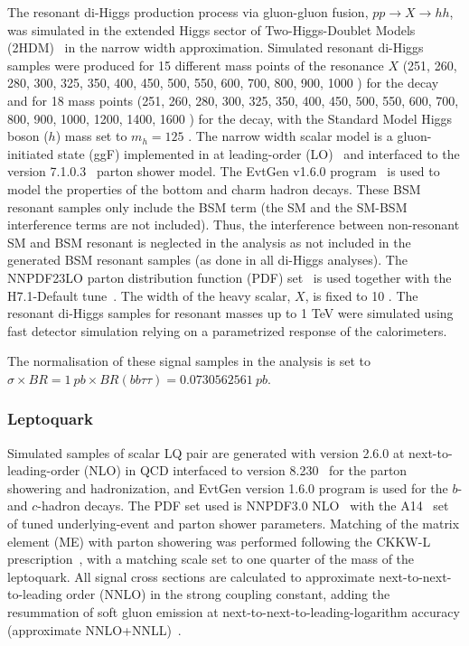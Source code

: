 The resonant di-Higgs production process via gluon-gluon fusion, $pp \rightarrow X \rightarrow hh$, was
simulated in the extended Higgs sector of Two-Higgs-Doublet Models
(2HDM)~\cite{Branco:2011iw} in the narrow width approximation. Simulated
resonant di-Higgs samples were produced for 15 different mass points of the
resonance $X$ (251, 260, 280, 300, 325, 350, 400, 450, 500, 550, 600, 700, 800,
900, 1000 \GeV) for the \lephad decay and for 18 mass points (251, 260, 280, 300, 325, 350, 400, 450, 500, 550, 600, 700, 800,
900, 1000, 1200, 1400, 1600 \GeV) for the \hadhad decay, with the Standard Model Higgs boson ($h$) mass set to $m_h=125$
\GeV. The narrow width scalar model is a gluon-initiated state (ggF) implemented in
\MADGRAPH at leading-order (LO)~\cite{mg5_lo} and interfaced to the  version 7.1.0.3~\cite{Herwigpp}
parton shower model. The EvtGen v1.6.0 program~\cite{EvtGen} is used to model the properties of the bottom and charm hadron decays. 
These BSM resonant samples only include the BSM term (the SM and the SM-BSM interference terms are not included). Thus, the interference between non-resonant SM and BSM resonant is neglected in the analysis as not included in the generated BSM resonant samples (as done in all di-Higgs analyses). The NNPDF23LO parton distribution function (PDF)
set~\cite{NNPDF23PDFSet} is used together with the H7.1-Default
tune~\cite{Gieseke:2012ft}. The width of the heavy scalar, $X$, is fixed to 10
\MeV . The resonant di-Higgs samples for resonant masses up to 1 TeV were simulated using fast detector
simulation relying on a parametrized response of the calorimeters.

The normalisation of these signal samples in the analysis is set to $\sigma \times BR  = \SI{1}{pb} \times BR (bb \tau \tau)  =  0.073056256 \SI{1}{pb}$. 

\subsubsection{Leptoquark}
Simulated samples of scalar LQ pair are generated with \MGMCatNLO version 2.6.0 at next-to-leading-order (NLO) in QCD interfaced to  version 8.230~\cite{PYTHIA64, PYTHIA82} for the parton showering and hadronization, and EvtGen version 1.6.0 program is used for the $b$- and $c$-hadron decays. The PDF set used is NNPDF3.0 NLO~\cite{NNPDF} with the A14~\cite{A14tune} set of tuned underlying-event and parton shower parameters. Matching of the matrix element (ME) with parton showering was performed following the CKKW-L prescription~\cite{CKKW}, with a matching scale set to one quarter of the mass of the leptoquark. All signal cross sections are calculated to approximate next-to-next-to-leading order (NNLO) in the strong coupling constant, adding the resummation of soft gluon emission at next-to-next-to-leading-logarithm accuracy (approximate NNLO+NNLL)~\cite{NNLO1, NNLO2, NNLO3, NNLO4}.

